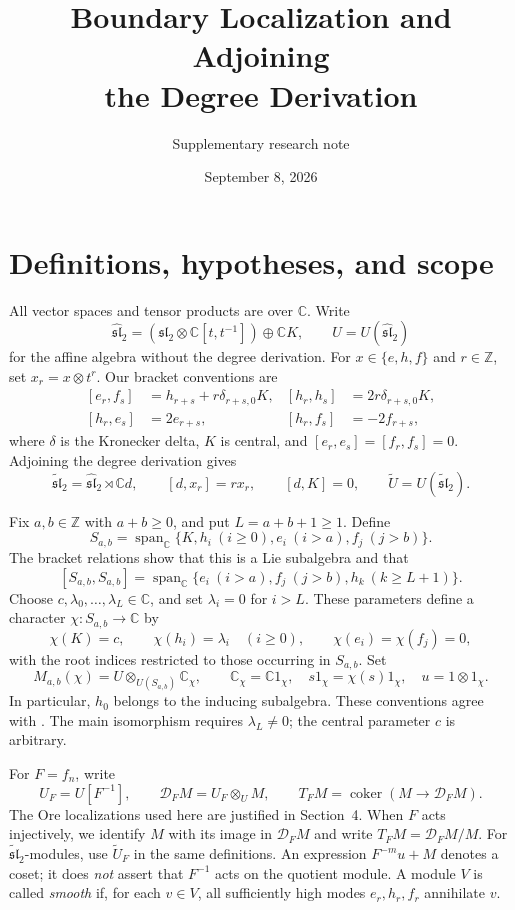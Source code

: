 \documentclass[11pt]{article}
\title{Boundary Localization and Adjoining\\the Degree Derivation}
\author{Supplementary research note}
\date{September 8, 2026}
\newcommand{\C}{\mathbb C}
\newcommand{\Z}{\mathbb Z}
\newcommand{\g}{\widehat{\mathfrak{sl}}_2}
\newcommand{\gt}{\widetilde{\mathfrak{sl}}_2}
\newcommand{\Span}{\operatorname{span}_{\C}}
\newcommand{\D}{\mathcal D}
\theoremstyle{definition}
\begin{document}
\maketitle

\section{Definitions, hypotheses, and scope}

All vector spaces and tensor products are over \(\C\). Write
\[
 \g=(\mathfrak{sl}_2\otimes\C[t,t^{-1}])\oplus\C K,
 \qquad U=U(\g)
\]
for the affine algebra without the degree derivation. For
\(x\in\{e,h,f\}\) and \(r\in\Z\), set \(x_r=x\otimes t^r\).
Our bracket conventions are
\begin{equation}\label{eq:brackets}
\begin{aligned}
 [e_r,f_s]&=h_{r+s}+r\delta_{r+s,0}K,
 &[h_r,h_s]&=2r\delta_{r+s,0}K,\\
 [h_r,e_s]&=2e_{r+s},
 &[h_r,f_s]&=-2f_{r+s},
\end{aligned}
\end{equation}
where \(\delta\) is the Kronecker delta, \(K\) is central, and
\([e_r,e_s]=[f_r,f_s]=0\). Adjoining the degree derivation gives
\[
 \gt=\g\rtimes\C d,\qquad [d,x_r]=rx_r,\qquad[d,K]=0,
 \qquad\widetilde U=U(\gt).
\]

Fix \(a,b\in\Z\) with \(a+b\ge0\), and put \(L=a+b+1\ge1\). Define
\[
 S_{a,b}=\Span\{K,h_i\ (i\ge0),e_i\ (i>a),f_j\ (j>b)\}.
\]
The bracket relations show that this is a Lie subalgebra and that
\[
 [S_{a,b},S_{a,b}]
 =\Span\{e_i\ (i>a),f_j\ (j>b),h_k\ (k\ge L+1)\}.
\]
Choose \(c,\lambda_0,\ldots,\lambda_L\in\C\), and set \(\lambda_i=0\)
for \(i>L\). These parameters define a character
\(\chi:S_{a,b}\to\C\) by
\[
 \chi(K)=c,\qquad\chi(h_i)=\lambda_i\quad(i\ge0),\qquad
 \chi(e_i)=\chi(f_j)=0,
\]
with the root indices restricted to those occurring in \(S_{a,b}\).
Set
\[
 M_{a,b}(\chi)=U\otimes_{U(S_{a,b})}\C_\chi,\qquad
 \C_\chi=\C1_\chi,\quad s1_\chi=\chi(s)1_\chi,\quad
 u=1\otimes1_\chi.
\]
In particular, \(h_0\) belongs to the inducing subalgebra. These conventions
agree with \cite[\S2.3]{FGXZ}. The main isomorphism requires
\(\lambda_L\ne0\); the central parameter \(c\) is arbitrary.

For \(F=f_n\), write
\[
 U_F=U[F^{-1}],\qquad
 \D_FM=U_F\otimes_U M,\qquad
 T_FM=\operatorname{coker}(M\longrightarrow\D_FM).
\]
The Ore localizations used here are justified in Section~4.
When \(F\) acts injectively, we identify \(M\) with its image in
\(\D_FM\) and write \(T_FM=\D_FM/M\). For \(\gt\)-modules, use
\(\widetilde U_F\) in the same definitions. An expression \(F^{-m}u+M\)
denotes a coset; it does \emph{not} assert that \(F^{-1}\) acts on the
quotient module. A module \(V\) is called \emph{smooth} if, for each
\(v\in V\), all sufficiently high modes \(e_r,h_r,f_r\) annihilate \(v\).
\end{document}
